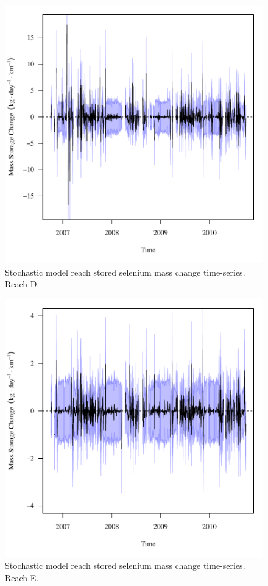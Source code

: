 \begin{figure}[htbp]
	\begin{center}
	\includegraphics[width=6in]{"Figures/Results_USR/f Segment D"}
	\caption{Stochastic model reach stored selenium mass change time-series.  Reach D.}
	\end{center}
\end{figure}

\begin{figure}[htbp]
	\begin{center}
	\includegraphics[width=6in]{"Figures/Results_USR/f Segment E"}
	\caption{Stochastic model reach stored selenium mass change time-series.  Reach E.}
	\end{center}
\end{figure}


